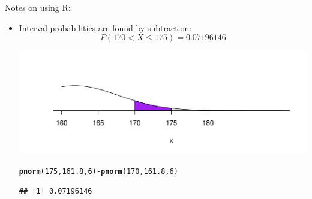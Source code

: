 \documentclass[t,xcolor=pdftex,dvipsnames,table]{beamer}
\makeatletter
\def\maxwidth{ %
  \ifdim\Gin@nat@width>\linewidth
    \linewidth
  \else
    \Gin@nat@width
  \fi
}
\newcommand{\hlnum}[1]{\textcolor[rgb]{0.686,0.059,0.569}{#1}}%
\newcommand{\hlopt}[1]{\textcolor[rgb]{0,0,0}{#1}}%
\newcommand{\hlstd}[1]{\textcolor[rgb]{0.345,0.345,0.345}{#1}}%
\newcommand{\hlkwd}[1]{\textcolor[rgb]{0.737,0.353,0.396}{\textbf{#1}}}%
\newenvironment{kframe}{%
 \def\at@end@of@kframe{}%
 \ifinner\ifhmode%
  \def\at@end@of@kframe{\end{minipage}}%
  \begin{minipage}{\columnwidth}%
 \fi\fi%
 \def\FrameCommand##1{\hskip\@totalleftmargin \hskip-\fboxsep
 \colorbox{shadecolor}{##1}\hskip-\fboxsep
     \hskip-\linewidth \hskip-\@totalleftmargin \hskip\columnwidth}%
 \MakeFramed {\advance\hsize-\width
   \@totalleftmargin\z@ \linewidth\hsize
   \@setminipage}}%
 {\par\unskip\endMakeFramed%
 \at@end@of@kframe}
\newenvironment{knitrout}{}{} %
\makeatother
\begin{document}
\begin{frame}[fragile]
Notes on using R:
\begin{itemize}
\item
Interval probabilities are found by subtraction:
\[ P( 170 < X \leq 175) = 0.07196146 \]

\begin{knitrout}
\color{fgcolor}
\includegraphics[width=\maxwidth]{figure/unnamed-chunk-12-1} 

\end{knitrout}

\begin{knitrout}
\color{fgcolor}\begin{kframe}
\begin{alltt}
\hlkwd{pnorm}\hlstd{(}\hlnum{175}\hlstd{,}\hlnum{161.8}\hlstd{,}\hlnum{6}\hlstd{)}\hlopt{-}\hlkwd{pnorm}\hlstd{(}\hlnum{170}\hlstd{,}\hlnum{161.8}\hlstd{,}\hlnum{6}\hlstd{)}
\end{alltt}
\begin{verbatim}
## [1] 0.07196146
\end{verbatim}
\end{kframe}
\end{knitrout}
\end{itemize}
\end{frame}
\end{document}
